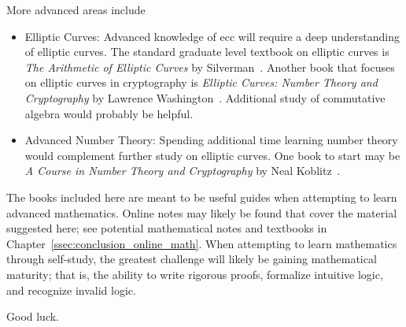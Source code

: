 More advanced areas include

\begin{itemize}
\item Elliptic Curves:
    Advanced knowledge of \gls{ecc} will
    require a deep understanding of \glspl{elliptic curve}.
    The standard graduate level textbook on \glspl{elliptic curve} is
    \emph{The Arithmetic of Elliptic Curves} by Silverman~\cite{AEC}.
    Another book that focuses on elliptic curves in cryptography
    is \emph{Elliptic Curves: Number Theory and Cryptography}
    by Lawrence Washington~\cite{WashingtonEllipticCurves}.
    Additional study of commutative algebra would probably be helpful.
\item Advanced Number Theory:
    Spending additional time learning \gls{number theory} would complement
    further study on \glspl{elliptic curve}.
    One book to start may be
    \emph{A Course in Number Theory and Cryptography}
    by Neal Koblitz~\cite{KoblitzCourseNTCrypto}.
\end{itemize}

\noindent
The books included here are meant to be useful guides when attempting
to learn advanced mathematics.
Online notes may likely be found that cover the material suggested here;
see potential mathematical notes and textbooks in
Chapter~\ref{ssec:conclusion_online_math}.
When attempting to learn mathematics through self-study,
the greatest challenge will likely be gaining mathematical maturity;
that is, the ability to write rigorous proofs, formalize intuitive logic,
and recognize invalid logic.

Good luck.
